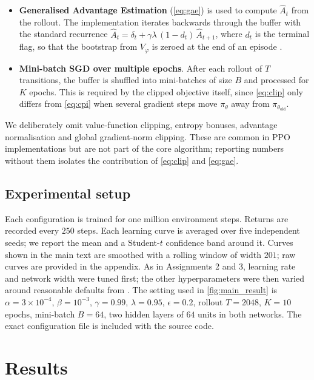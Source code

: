 \documentclass{article}
\theoremstyle{plain}
\theoremstyle{definition}
\theoremstyle{remark}
\begin{document}
\begin{itemize}
    \item \textbf{Generalised Advantage Estimation} (\cref{eq:gae}) is used to compute $\hat A_t$ from the rollout. The implementation iterates backwards through the buffer with the standard recurrence $\hat A_t = \delta_t + \gamma\lambda\,(1-d_t)\,\hat A_{t+1}$, where $d_t$ is the terminal flag, so that the bootstrap from $V_\varphi$ is zeroed at the end of an episode \cite{schulman2016gae}.
    \item \textbf{Mini-batch SGD over multiple epochs}. After each rollout of $T$ transitions, the buffer is shuffled into mini-batches of size $B$ and processed for $K$ epochs. This is required by the clipped objective itself, since \cref{eq:clip} only differs from \cref{eq:cpi} when several gradient steps move $\pi_\theta$ away from $\pi_{\theta_{\mathrm{old}}}$.
\end{itemize}

We deliberately omit value-function clipping, entropy bonuses, advantage normalisation and global gradient-norm clipping. These are common in PPO implementations \cite{engstrom2020implementation} but are not part of the core algorithm; reporting numbers without them isolates the contribution of \cref{eq:clip} and \cref{eq:gae}.

\subsection{Experimental setup}\label{sec:experiments:setup}

Each configuration is trained for one million environment steps. Returns are recorded every $250$ steps. Each learning curve is averaged over five independent seeds; we report the mean and a Student-$t$ confidence band around it. Curves shown in the main text are smoothed with a rolling window of width $201$; raw curves are provided in the appendix. As in Assignments 2 and 3, learning rate and network width were tuned first; the other hyperparameters were then varied around reasonable defaults from \cite{schulman2017ppo}. The setting used in \autoref{fig:main_result} is $\alpha=3\!\times\!10^{-4}$, $\beta=10^{-3}$, $\gamma=0.99$, $\lambda=0.95$, $\epsilon=0.2$, rollout $T=2048$, $K=10$ epochs, mini-batch $B=64$, two hidden layers of $64$ units in both networks. The exact configuration file is included with the source code.

\section{Results}\label{sec:results}
\end{document}
